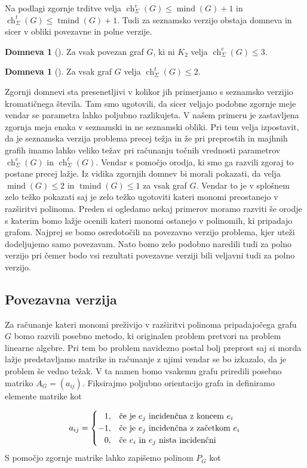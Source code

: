 \documentclass[12pt,a4paper,twoside]{article}
\theoremstyle{definition} %
\newtheorem{domneva}[definicija]{Domneva}
\theoremstyle{plain} %
\newcommand{\ecl}{\ch_{\Sigma}^e}
\newcommand{\eclt}{\ch_{\Sigma}^t}
\numberwithin{equation}{section}  %
\DeclareMathOperator{\mind}{mind}
\DeclareMathOperator{\tmind}{tmind}
\DeclareMathOperator{\ch}{ch}
\begin{document}
Na podlagi zgornje trditve velja $\ecl(G) \le \mind(G) + 1$ in $\eclt(G) \le \tmind(G) + 1$. Tudi za seznamsko verzijo obstaja domneva in sicer v obliki povezavne in polne verzije.

 \begin{domneva}[\cite{alg_org}]
Za vsak povezan graf $G$, ki ni $K_2$ velja $\ecl(G) \le 3$.
\end{domneva}

 \begin{domneva}[\cite{algebraic}]
Za vsak  graf $G$ velja $\eclt(G) \le 2$.
\end{domneva}
Zgornji domnevi sta presenetljivi v kolikor jih primerjamo s seznamsko verzijio kromatičnega števila. Tam smo ugotovili, da sicer veljajo podobne zgornje meje vendar se parametra lahko poljubno razlikujeta. V našem primeru je zastavljena zgornja meja enaka v seznamski in ne seznamski obliki. Pri tem velja izpostavit, da je seznamska verzija problema precej težja in že pri preprostih in majhnih grafih imamo lahko veliko težav pri računanju točnih vrednosti parametrov $\ecl(G)$ in $\eclt(G)$. Vendar s pomočjo orodja, ki smo ga razvili zgoraj to postane precej lažje. Iz vidika zgornjih domnev bi morali pokazati, da velja $\mind(G) \le 2 $ in $\tmind(G) \le 1$ za vsak graf $G$. Vendar to je v splošnem zelo težko pokazati saj je zelo težko ugotoviti kateri monomi preostanejo v razširitvi polinoma. Preden si ogledamo nekaj primerov moramo razviti še orodje s katerim bomo lažje ocenili kateri monomi ostanejo v polinomih, ki pripadajo grafom. Najprej se bomo osredotočili na povezavno verzijo problema, kjer uteži dodeljujemo samo povezavam. Nato bomo zelo podobno naredili tudi za polno verzijo pri čemer bodo vsi rezultati povezavne verziji bili veljavni tudi za polno verzijo.

\subsection{Povezavna verzija}
Za računanje kateri monomi preživijo v razširitvi polinoma pripadajočega grafu $G$ bomo razvili posebno metodo, ki originalen problem pretvori na problem linearne algebre. Pri tem bo problem navidezno postal bolj preprost saj si morda lažje predstavljamo matrike in računanje z njimi vendar se bo izkazalo, da je problem še vedno težak.
 V ta namen bomo vsakemu grafu priredili posebno matriko $A_G = (a_{ij})$. Fiksirajmo poljubno orientacijo grafa in definiramo elemente matrike kot 

\begin{equation*}
a_{ij} = 
\begin{cases}

\phantom{-}1, & \text{če je $e_j$ incidenčna z koncem $e_i$}\\ 
	-1, & \text{če je $ e_j$ incidenčna z začetkom  $e_i$} \\

\phantom{-}0, & \text{če $e_i$ in $e_j$ nista incidenčni}
\end{cases}
\end{equation*}
S pomočjo zgornje matrike lahko zapišemo polinom $P_G$ kot
\end{document}
